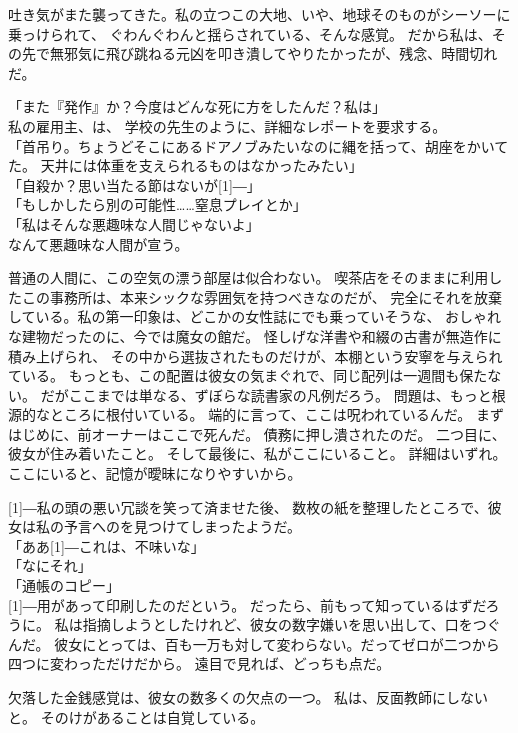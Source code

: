 \documentclass[../HiganMain]{subfiles}
\begin{document}

吐き気がまた襲ってきた。私の立つこの大地、いや、地球そのものがシーソーに乗っけられて、
ぐわんぐわんと揺らされている、そんな感覚。
だから私は、その先で無邪気に飛び跳ねる元凶を叩き潰してやりたかったが、残念、時間切れだ。

「また『発作』か？今度はどんな死に方をしたんだ？私は」\\
私の雇用主、は、
学校の先生のように、詳細なレポートを要求する。\\
「首吊り。ちょうどそこにあるドアノブみたいなのに縄を括って、胡座をかいてた。
天井には体重を支えられるものはなかったみたい」\\
「自殺か？思い当たる節はないが\scalebox{3}[1]{―}」\\
「もしかしたら別の可能性……窒息プレイとか」\\
「私はそんな悪趣味な人間じゃないよ」\\
なんて悪趣味な人間が宣う。

普通の人間に、この空気の漂う部屋は似合わない。
喫茶店をそのままに利用したこの事務所は、本来シックな雰囲気を持つべきなのだが、
完全にそれを放棄している。私の第一印象は、どこかの女性誌にでも乗っていそうな、
おしゃれな建物だったのに、今では魔女の館だ。
怪しげな洋書や和綴の古書が無造作に積み上げられ、
その中から選抜されたものだけが、本棚という安寧を与えられている。
もっとも、この配置は彼女の気まぐれで、同じ配列は一週間も保たない。
だがここまでは単なる、ずぼらな読書家の凡例だろう。
問題は、もっと根源的なところに根付いている。
端的に言って、ここは呪われているんだ。
まずはじめに、前オーナーはここで死んだ。
債務に押し潰されたのだ。
二つ目に、彼女が住み着いたこと。
そして最後に、私がここにいること。
詳細はいずれ。
ここにいると、記憶が曖昧になりやすいから。

\scalebox{3}[1]{―}私の頭の悪い冗談を笑って済ませた後、
数枚の紙を整理したところで、彼女は私の予言へのを見つけてしまったようだ。\\
「ああ\scalebox{3}[1]{―}これは、不味いな」\\
「なにそれ」\\
「通帳のコピー」\\
\scalebox{3}[1]{―}用があって印刷したのだという。
だったら、前もって知っているはずだろうに。
私は指摘しようとしたけれど、彼女の数字嫌いを思い出して、口をつぐんだ。
彼女にとっては、百も一万も対して変わらない。だってゼロが二つから四つに変わっただけだから。
遠目で見れば、どっちも点だ。

欠落した金銭感覚は、彼女の数多くの欠点の一つ。
私は、反面教師にしないと。
そのけがあることは自覚している。
\end{document}
